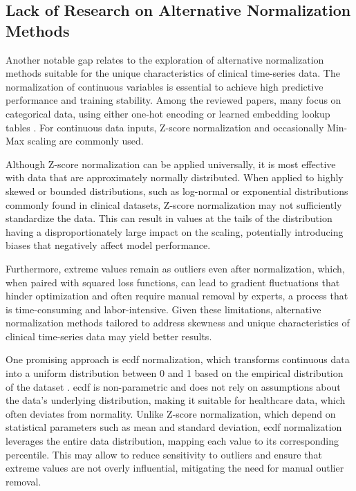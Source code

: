 \subsection{Lack of Research on Alternative Normalization Methods}

Another notable gap relates to the exploration of alternative normalization methods suitable for the unique characteristics of clinical time-series data. The normalization of continuous variables is essential to achieve high predictive performance and training stability. Among the reviewed papers, many focus on categorical data, using either one-hot encoding \cite{HiTANet2020,SANSformers2021} or learned embedding lookup tables \cite{T3Net2021,HiBEHRT2023,TransformEHR2023,SETOR2021}. For continuous data inputs, Z-score normalization \cite{MultidimensionalPatientAcuity2022,mvtsTransformer2020,STraTS2022} and occasionally Min-Max scaling \cite{DeepTransformerModels2020} are commonly used.

Although Z-score normalization can be applied universally, it is most effective with data that are approximately normally distributed. When applied to highly skewed or bounded distributions, such as log-normal or exponential distributions commonly found in clinical datasets, Z-score normalization may not sufficiently standardize the data. This can result in values at the tails of the distribution having a disproportionately large impact on the scaling, potentially introducing biases that negatively affect model performance.

Furthermore, extreme values remain as outliers even after normalization, which, when paired with squared loss functions, can lead to gradient fluctuations that hinder optimization and often require manual removal by experts, a process that is time-consuming and labor-intensive. Given these limitations, alternative normalization methods tailored to address skewness and unique characteristics of clinical time-series data may yield better results.

One promising approach is \gls{ecdf} normalization, which transforms continuous data into a uniform distribution between \num{0} and \num{1} based on the empirical distribution of the dataset \cite[][219]{ModernIntroductionProbability2005}. \Gls{ecdf} is non-parametric and does not rely on assumptions about the data's underlying distribution, making it suitable for healthcare data, which often deviates from normality. Unlike Z-score  normalization, which depend on statistical parameters such as mean and standard deviation, \gls{ecdf} normalization leverages the entire data distribution, mapping each value to its corresponding percentile. This may allow to reduce sensitivity to outliers and ensure that extreme values are not overly influential, mitigating the need for manual outlier removal.

